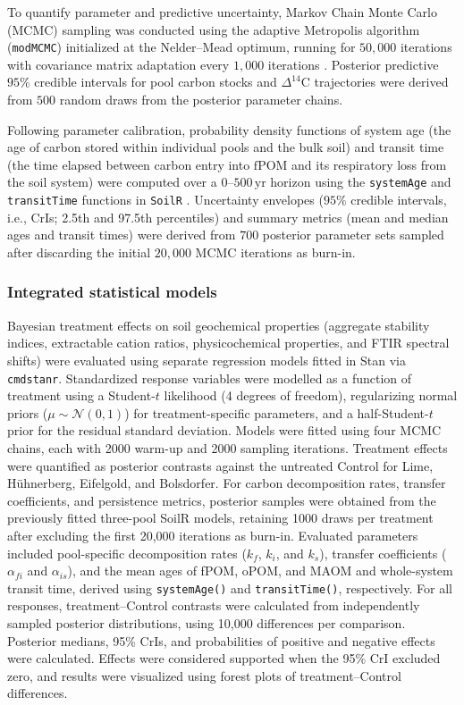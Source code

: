 \documentclass[preprint,12pt]{elsarticle}
\begin{document}
To quantify parameter and predictive uncertainty, Markov Chain Monte Carlo (MCMC) sampling was conducted using the adaptive Metropolis algorithm (\texttt{modMCMC}) initialized at the Nelder--Mead optimum, running for $50{,}000$ iterations with covariance matrix adaptation every $1{,}000$ iterations \citep{Soetaert2010}. Posterior predictive $95\%$ credible intervals for pool carbon stocks and $\Delta^{14}\text{C}$ trajectories were derived from $500$ random draws from the posterior parameter chains.

Following parameter calibration, probability density functions of system age (the age of carbon stored within individual pools and the bulk soil) and transit time (the time elapsed between carbon entry into $\text{fPOM}$ and its respiratory loss from the soil system) were computed over a $0\text{--}500\,\text{yr}$ horizon using the \texttt{systemAge} and \texttt{transitTime} functions in \texttt{SoilR} \citep{Sierra2017, Sierra2018}. Uncertainty envelopes ($95\%$ credible intervals, i.e., CrIs; 2.5th and 97.5th percentiles) and summary metrics (mean and median ages and transit times) were derived from $700$ posterior parameter sets sampled after discarding the initial $20{,}000$ MCMC iterations as burn-in.

\subsubsection{Integrated statistical models}
Bayesian treatment effects on soil geochemical properties (aggregate stability indices, extractable cation ratios, physicochemical properties, and FTIR spectral shifts) were evaluated using separate regression models fitted in Stan via \texttt{cmdstanr}. Standardized response variables were modelled as a function of treatment using a Student-$t$ likelihood (4 degrees of freedom), regularizing normal priors ($\mu \sim \mathcal{N}(0,1)$) for treatment-specific parameters, and a half-Student-$t$ prior for the residual standard deviation. Models were fitted using four MCMC chains, each with 2000 warm-up and 2000 sampling iterations. Treatment effects were quantified as posterior contrasts against the untreated Control for Lime, H\"uhnerberg, Eifelgold, and Bolsdorfer. For carbon decomposition rates, transfer coefficients, and persistence metrics, posterior samples were obtained from the previously fitted three-pool SoilR models, retaining 1000 draws per treatment after excluding the first 20,000 iterations as burn-in. Evaluated parameters included pool-specific decomposition rates ($k_f$, $k_i$, and $k_s$), transfer coefficients ($\alpha_{fi}$ and $\alpha_{is}$), and the mean ages of fPOM, oPOM, and MAOM and whole-system transit time, derived using \texttt{systemAge()} and \texttt{transitTime()}, respectively. For all responses, treatment--Control contrasts were calculated from independently sampled posterior distributions, using 10,000 differences per comparison. Posterior medians, 95\% CrIs, and probabilities of positive and negative effects were calculated. Effects were considered supported when the 95\% CrI excluded zero, and results were visualized using forest plots of treatment--Control differences.
\end{document}
